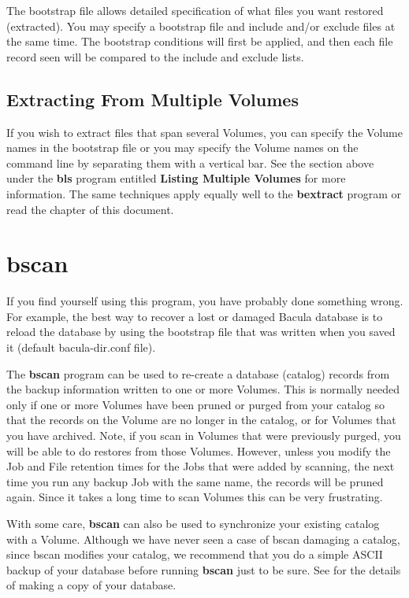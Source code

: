 The bootstrap file allows detailed specification of what files you want
restored (extracted). You may specify a bootstrap file and include and/or
exclude files at the same time. The bootstrap conditions will first be
applied, and then each file record seen will be compared to the include and
exclude lists.

\subsection{Extracting From Multiple Volumes}

If you wish to extract files that span several Volumes, you can specify the
Volume names in the bootstrap file or you may specify the Volume names on the
command line by separating them with a vertical bar. See the section above
under the {\bf bls} program entitled {\bf Listing Multiple Volumes} for more
information. The same techniques apply equally well to the {\bf bextract}
program or read the 
chapter of this document.

\section{bscan}
\label{bscan}

If you find yourself using this program, you have probably done something
wrong. For example, the best way to recover a lost or damaged Bacula
database is to reload the database by using the bootstrap file that
was written when you saved it (default bacula-dir.conf file).

The {\bf bscan} program can be used to re-create a database (catalog)
records from the backup information written to one or more Volumes.  This
is normally needed only if one or more Volumes have been pruned or purged
from your catalog so that the records on the Volume are no longer in the
catalog, or for Volumes that you have archived.  Note, if you scan in
Volumes that were previously purged, you will be able to do restores from
those Volumes.  However, unless you modify the Job and File retention times
for the Jobs that were added by scanning, the next time you run any backup Job
with the same name, the records will be pruned again.  Since it takes a
long time to scan Volumes this can be very frustrating.

With some care, {\bf bscan} can also be used to synchronize your existing
catalog with a Volume.  Although we have never seen a case of bscan
damaging a catalog, since bscan modifies your catalog, we recommend that
you do a simple ASCII backup of your database before running {\bf bscan}
just to be sure.  See  for
the details of making a copy of your database.

